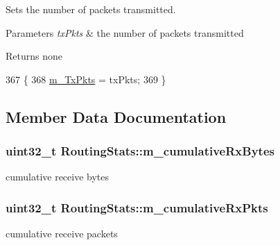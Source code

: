 Sets the number of packets transmitted. 


\begin{DoxyParams}{Parameters}
{\em tx\+Pkts} & the number of packets transmitted \\
\hline
\end{DoxyParams}
\begin{DoxyReturn}{Returns}
none 
\end{DoxyReturn}

\begin{DoxyCode}
367 \{
368   \hyperlink{classRoutingStats_a34e64661d6d5886863226f0c0dd7d613}{m\_TxPkts} = txPkts;
369 \}
\end{DoxyCode}


\subsection{Member Data Documentation}
\subsubsection[{\texorpdfstring{m\+\_\+cumulative\+Rx\+Bytes}{m_cumulativeRxBytes}}]{\setlength{\rightskip}{0pt plus 5cm}uint32\+\_\+t Routing\+Stats\+::m\+\_\+cumulative\+Rx\+Bytes\hspace{0.3cm}{\ttfamily [private]}}\hypertarget{classRoutingStats_a02a715726c3d89a0ff6693fe99b1d247}{}\label{classRoutingStats_a02a715726c3d89a0ff6693fe99b1d247}


cumulative receive bytes 

\subsubsection[{\texorpdfstring{m\+\_\+cumulative\+Rx\+Pkts}{m_cumulativeRxPkts}}]{\setlength{\rightskip}{0pt plus 5cm}uint32\+\_\+t Routing\+Stats\+::m\+\_\+cumulative\+Rx\+Pkts\hspace{0.3cm}{\ttfamily [private]}}\hypertarget{classRoutingStats_a484d7f31fc457f1e5cc3c593e1152798}{}\label{classRoutingStats_a484d7f31fc457f1e5cc3c593e1152798}


cumulative receive packets 

